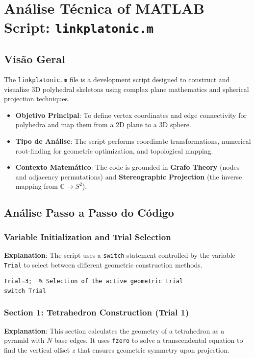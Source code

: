 
\chapter{Análise Técnica of MATLAB Script: \texttt{linkplatonic.m}}
\section{Visão Geral}

The \texttt{linkplatonic.m} file is a development script designed to construct and visualize 3D polyhedral skeletons using complex plane mathematics and spherical projection techniques.

\begin{itemize}
    \item \textbf{Objetivo Principal}: To define vertex coordinates and edge connectivity for polyhedra and map them from a 2D plane to a 3D sphere.
    \item \textbf{Tipo de Análise}: The script performs coordinate transformations, numerical root-finding for geometric optimization, and topological mapping.
    \item \textbf{Contexto Matemático}: The code is grounded in \textbf{Grafo Theory} (nodes and adjacency permutations) and \textbf{Stereographic Projection} (the inverse mapping from $\mathbb{C} \to S^2$).
\end{itemize}

\section{Análise Passo a Passo do Código}

\subsection{Variable Initialization and Trial Selection}
\textbf{Explanation}: The script uses a \texttt{switch} statement controlled by the variable \texttt{Trial} to select between different geometric construction methods.

\begin{lstlisting}
Trial=3;  % Selection of the active geometric trial
switch Trial
\end{lstlisting}

\subsection{Section 1: Tetrahedron Construction (Trial 1)}
\textbf{Explanation}: This section calculates the geometry of a tetrahedron as a pyramid with $N$ base edges. It uses \texttt{fzero} to solve a transcendental equation to find the vertical offset $z$ that ensures geometric symmetry upon projection.

